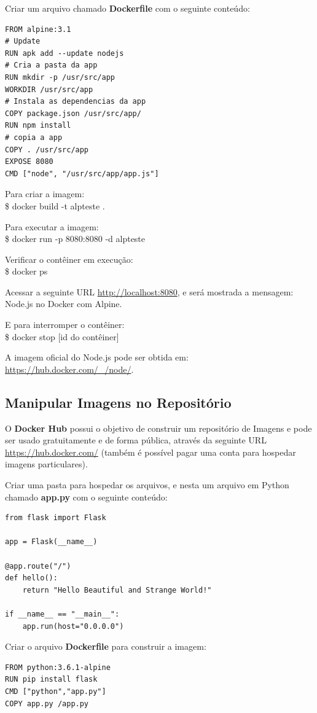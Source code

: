 \documentclass[a4paper,11pt]{article}
\begin{document}
Criar um arquivo chamado \textbf{Dockerfile} com o seguinte conteúdo:
\begin{lstlisting}
FROM alpine:3.1
# Update
RUN apk add --update nodejs
# Cria a pasta da app
RUN mkdir -p /usr/src/app
WORKDIR /usr/src/app
# Instala as dependencias da app
COPY package.json /usr/src/app/
RUN npm install
# copia a app
COPY . /usr/src/app
EXPOSE 8080
CMD ["node", "/usr/src/app/app.js"]
\end{lstlisting}

Para criar a imagem: \\
{\ttfamily\$ docker build -t alpteste .}

Para executar a imagem: \\
{\ttfamily\$ docker run -p 8080:8080 -d alpteste}

Verificar o contêiner em execução: \\
{\ttfamily\$ docker ps}

Acessar a seguinte URL \url{http://localhost:8080}, e será mostrada a mensagem: \\ {\ttfamily Node.js no Docker com Alpine}.

E para interromper o contêiner: \\
{\ttfamily\$ docker stop [id do contêiner]}

A imagem oficial do Node.js pode ser obtida em: 
\url{https://hub.docker.com/_/node/}.

\subsection{Manipular Imagens no Repositório}
O \textbf{Docker Hub} possui o objetivo de construir um repositório de Imagens e pode ser usado gratuitamente e de forma pública, através da seguinte URL \url{https://hub.docker.com/} (também é possível pagar uma conta para hospedar imagens particulares).

Criar uma pasta para hospedar os arquivos, e nesta um arquivo em Python chamado \textbf{app.py} com o seguinte conteúdo:
\begin{lstlisting}
from flask import Flask

app = Flask(__name__)

@app.route("/")
def hello():
	return "Hello Beautiful and Strange World!"

if __name__ == "__main__":
	app.run(host="0.0.0.0")
\end{lstlisting}

Criar o arquivo \textbf{Dockerfile} para construir a imagem:
\begin{lstlisting}
FROM python:3.6.1-alpine
RUN pip install flask
CMD ["python","app.py"]
COPY app.py /app.py
\end{lstlisting}
\end{document}
